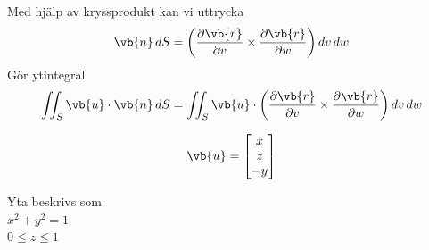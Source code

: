 Med hjälp av kryssprodukt kan vi uttrycka
\[ \vb{n}\,dS = \left( \frac{\partial\vb{r}}{\partial v} \times \frac{\partial\vb{r}}{\partial w} \right) dv\,dw \]
Gör ytintegral
\[ \iint_S \vb{u} \cdot \vb{n}\,dS = \iint_S \vb{u} \cdot \left( \frac{\partial\vb{r}}{\partial v} \times \frac{\partial\vb{r}}{\partial w} \right) dv\,dw \]

\begin{example}
\begin{minipage}{0.3\linewidth}
\[ \vb{u} = \begin{bmatrix} x \\ z \\ -y \end{bmatrix} \]
\end{minipage}
\begin{minipage}{0.3\linewidth}
\end{minipage}
\begin{minipage}{0.36\linewidth}
Yta beskrivs som\\
$x^2 + y^2 = 1$\\
$0 \le z \le 1$
\end{minipage}


\end{example}
